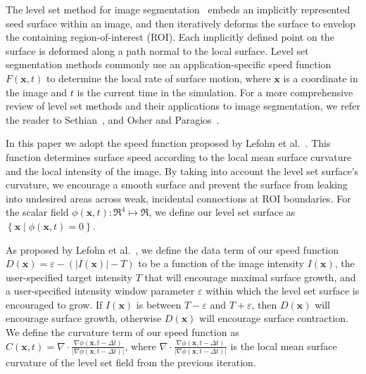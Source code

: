 \documentclass{egpubl}
\newcommand{\leftbracket}{\left(}
\newcommand{\rightbracket}{\right)}
\newcommand{\leftcbracket}{\left\{}
\newcommand{\rightcbracket}{\right\}}
\newcommand{\leftvbracket}{\left|}
\newcommand{\rightvbracket}{\right|}
\newcommand{\boldx}{{\mathbf x}}
\newcommand{\phixt}{ \mathit{\phi} \leftbracket \boldx , t \rightbracket }
\newcommand{\phixtmdt}{ \mathit{\phi} \leftbracket \boldx , t - \Delta t \rightbracket }
\newcommand{\ix}{I \leftbracket \boldx \rightbracket}
\newcommand{\curvatureterm}{ \nabla \cdot \frac{\nabla \phixtmdt }{ \leftvbracket \nabla \phixtmdt \rightvbracket } }
\begin{document}
The level set method for image segmentation~\cite{Whitaker-1994} embeds an implicitly represented seed surface within an image, and then iteratively deforms the surface to envelop the containing region-of-interest (ROI). Each implicitly defined point on the surface is deformed along a path normal to the local surface. Level set segmentation methods commonly use an application-specific speed function $ F \leftbracket \boldx , t \rightbracket $ to determine the local rate of surface motion, where $\boldx$ is a coordinate in the image and $t$ is the current time in the simulation. For a more comprehensive review of level set methods and their applications to image segmentation, we refer the reader to Sethian~\cite{Sethian-1999}, and Osher and Paragios~\cite{Osher-2003}.

In this paper we adopt the speed function proposed by Lefohn et al.~\cite{Lefohn-2003-MICCAI,Lefohn-2003-Vis,Lefohn-2004}. This function determines surface speed according to the local mean surface curvature and the local intensity of the image. By taking into account the level set surface's curvature, we encourage a smooth surface and prevent the surface from leaking into undesired areas across weak, incidental connections at ROI boundaries. For the scalar field $ \phixt : \mathfrak{R}^4 \mapsto \mathfrak{R} $, we define our level set surface as $ \leftcbracket \boldx \mid \phixt = 0 \rightcbracket $.

As proposed by Lefohn et al.~\cite{Lefohn-2003-MICCAI,Lefohn-2003-Vis,Lefohn-2004}, we define the data term of our speed function $D \leftbracket \boldx \rightbracket = \varepsilon - \leftbracket \leftvbracket \ix \rightvbracket - T \rightbracket $ to be a function of the image intensity $\ix$, the user-specified target intensity $T$ that will encourage maximal surface growth, and a user-specified intensity window parameter $\varepsilon $ within which the level set surface is encouraged to grow. If $\ix$ is between $T-\varepsilon $ and $T+\varepsilon $, then $D \leftbracket \boldx \rightbracket $ will encourage surface growth, otherwise $D \leftbracket \boldx \rightbracket $ will encourage surface contraction. We define the curvature term of our speed function as $ C \leftbracket \boldx , t \rightbracket = \curvatureterm $, where $ \curvatureterm $ is the local mean surface curvature of the level set field from the previous iteration.
\end{document}
